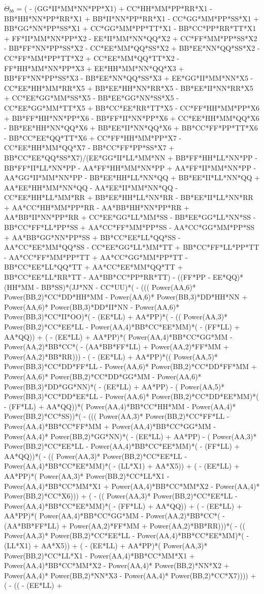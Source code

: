 \documentclass[10pt]{article} %
\begin{document}
$\dot{\Theta}_{bb}$ =
{\tiny
( - (GG*II*MM*NN*PP*X1) + CC*HH*MM*PP*RR*X1 - BB*HH*NN*PP*RR*X1 + BB*II*NN*PP*RR*X1 - CC*GG*MM*PP*SS*X1 + BB*GG*NN*PP*SS*X1 + CC*GG*MM*PP*TT*X1 - BB*CC*PP*RR*TT*X1 + FF*II*MM*NN*PP*X2 - EE*II*MM*NN*QQ*X2 + CC*FF*MM*PP*SS*X2 - BB*FF*NN*PP*SS*X2 - CC*EE*MM*QQ*SS*X2 + BB*EE*NN*QQ*SS*X2 - CC*FF*MM*PP*TT*X2 + CC*EE*MM*QQ*TT*X2 - FF*HH*MM*NN*PP*X3 + EE*HH*MM*NN*QQ*X3 + BB*FF*NN*PP*SS*X3 - BB*EE*NN*QQ*SS*X3 + EE*GG*II*MM*NN*X5 - CC*EE*HH*MM*RR*X5 + BB*EE*HH*NN*RR*X5 - BB*EE*II*NN*RR*X5 + CC*EE*GG*MM*SS*X5 - BB*EE*GG*NN*SS*X5 - CC*EE*GG*MM*TT*X5 + BB*CC*EE*RR*TT*X5 - CC*FF*HH*MM*PP*X6 + BB*FF*HH*NN*PP*X6 - BB*FF*II*NN*PP*X6 + CC*EE*HH*MM*QQ*X6 - BB*EE*HH*NN*QQ*X6 + BB*EE*II*NN*QQ*X6 + BB*CC*FF*PP*TT*X6 - BB*CC*EE*QQ*TT*X6 + CC*FF*HH*MM*PP*X7 - CC*EE*HH*MM*QQ*X7 - BB*CC*FF*PP*SS*X7 + BB*CC*EE*QQ*SS*X7)/(EE*GG*II*LL*MM*NN + BB*FF*HH*LL*NN*PP - BB*FF*II*LL*NN*PP - AA*FF*HH*MM*NN*PP + AA*FF*II*MM*NN*PP - AA*GG*II*MM*NN*PP - BB*EE*HH*LL*NN*QQ + BB*EE*II*LL*NN*QQ + AA*EE*HH*MM*NN*QQ - AA*EE*II*MM*NN*QQ - CC*EE*HH*LL*MM*RR + BB*EE*HH*LL*NN*RR - BB*EE*II*LL*NN*RR + AA*CC*HH*MM*PP*RR - AA*BB*HH*NN*PP*RR + AA*BB*II*NN*PP*RR + CC*EE*GG*LL*MM*SS - BB*EE*GG*LL*NN*SS - BB*CC*FF*LL*PP*SS + AA*CC*FF*MM*PP*SS - AA*CC*GG*MM*PP*SS + AA*BB*GG*NN*PP*SS + BB*CC*EE*LL*QQ*SS - AA*CC*EE*MM*QQ*SS - CC*EE*GG*LL*MM*TT + BB*CC*FF*LL*PP*TT - AA*CC*FF*MM*PP*TT + AA*CC*GG*MM*PP*TT - BB*CC*EE*LL*QQ*TT + AA*CC*EE*MM*QQ*TT + BB*CC*EE*LL*RR*TT - AA*BB*CC*PP*RR*TT) - ((FF*PP - EE*QQ)*(HH*MM - BB*SS)*(JJ*NN - CC*UU)*( - ((( Power(AA,6)* Power(BB,2)*CC*DD*HH*MM -  Power(AA,6)* Power(BB,3)*DD*HH*NN +  Power(AA,6)* Power(BB,3)*DD*II*NN -  Power(AA,6)* Power(BB,3)*CC*II*OO)*( - (EE*LL) + AA*PP)*( - (( Power(AA,3)* Power(BB,2)*CC*EE*LL -  Power(AA,4)*BB*CC*EE*MM)*( - (FF*LL) + AA*QQ)) + ( - (EE*LL) + AA*PP)*( Power(AA,4)*BB*CC*GG*MM -  Power(AA,2)*BB*CC*( - (AA*BB*FF*LL) +  Power(AA,2)*FF*MM +  Power(AA,2)*BB*RR))) - ( - (EE*LL) + AA*PP)*(( Power(AA,5)* Power(BB,3)*CC*DD*FF*LL -  Power(AA,6)* Power(BB,2)*CC*DD*FF*MM +  Power(AA,6)* Power(BB,2)*CC*DD*GG*MM -  Power(AA,6)* Power(BB,3)*DD*GG*NN)*( - (EE*LL) + AA*PP) - ( Power(AA,5)* Power(BB,3)*CC*DD*EE*LL -  Power(AA,6)* Power(BB,2)*CC*DD*EE*MM)*( - (FF*LL) + AA*QQ))*( Power(AA,4)*BB*CC*HH*MM -  Power(AA,4)* Power(BB,2)*CC*SS))*( - ((( Power(AA,3)* Power(BB,2)*CC*FF*LL -  Power(AA,4)*BB*CC*FF*MM +  Power(AA,4)*BB*CC*GG*MM -  Power(AA,4)* Power(BB,2)*GG*NN)*( - (EE*LL) + AA*PP) - ( Power(AA,3)* Power(BB,2)*CC*EE*LL -  Power(AA,4)*BB*CC*EE*MM)*( - (FF*LL) + AA*QQ))*( - (( Power(AA,3)* Power(BB,2)*CC*EE*LL -  Power(AA,4)*BB*CC*EE*MM)*( - (LL*X1) + AA*X5)) + ( - (EE*LL) + AA*PP)*( Power(AA,3)* Power(BB,2)*CC*LL*X1 -  Power(AA,4)*BB*CC*MM*X1 +  Power(AA,4)*BB*CC*MM*X2 -  Power(AA,4)* Power(BB,2)*CC*X6))) + ( - (( Power(AA,3)* Power(BB,2)*CC*EE*LL -  Power(AA,4)*BB*CC*EE*MM)*( - (FF*LL) + AA*QQ)) + ( - (EE*LL) + AA*PP)*( Power(AA,4)*BB*CC*GG*MM -  Power(AA,2)*BB*CC*( - (AA*BB*FF*LL) +  Power(AA,2)*FF*MM +  Power(AA,2)*BB*RR)))*( - (( Power(AA,3)* Power(BB,2)*CC*EE*LL -  Power(AA,4)*BB*CC*EE*MM)*( - (LL*X1) + AA*X5)) + ( - (EE*LL) + AA*PP)*( Power(AA,3)* Power(BB,2)*CC*LL*X1 -  Power(AA,4)*BB*CC*MM*X1 +  Power(AA,4)*BB*CC*MM*X2 -  Power(AA,4)* Power(BB,2)*NN*X2 +  Power(AA,4)* Power(BB,2)*NN*X3 -  Power(AA,4)* Power(BB,2)*CC*X7)))) + ( - (( - (EE*LL) + }
\end{document}
